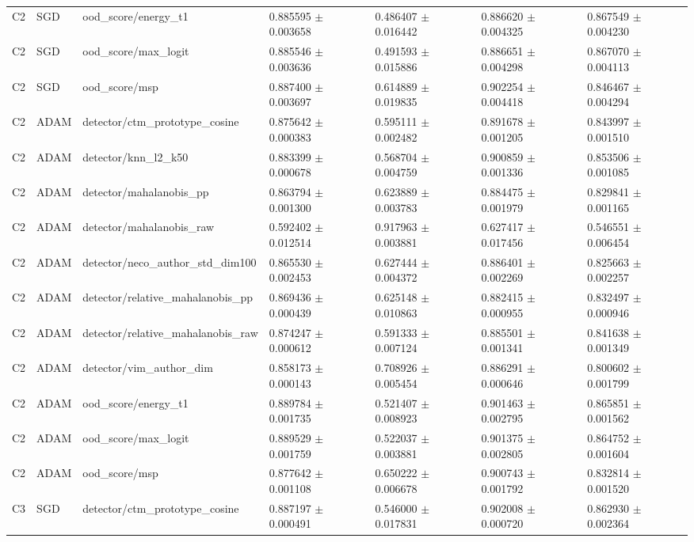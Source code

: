 \begin{longtable}{lllllll}
C2 & SGD & ood\_score/energy\_t1 & 0.885595 $\pm$ 0.003658 & 0.486407 $\pm$ 0.016442 & 0.886620 $\pm$ 0.004325 & 0.867549 $\pm$ 0.004230 \\
C2 & SGD & ood\_score/max\_logit & 0.885546 $\pm$ 0.003636 & 0.491593 $\pm$ 0.015886 & 0.886651 $\pm$ 0.004298 & 0.867070 $\pm$ 0.004113 \\
C2 & SGD & ood\_score/msp & 0.887400 $\pm$ 0.003697 & 0.614889 $\pm$ 0.019835 & 0.902254 $\pm$ 0.004418 & 0.846467 $\pm$ 0.004294 \\
C2 & ADAM & detector/ctm\_prototype\_cosine & 0.875642 $\pm$ 0.000383 & 0.595111 $\pm$ 0.002482 & 0.891678 $\pm$ 0.001205 & 0.843997 $\pm$ 0.001510 \\
C2 & ADAM & detector/knn\_l2\_k50 & 0.883399 $\pm$ 0.000678 & 0.568704 $\pm$ 0.004759 & 0.900859 $\pm$ 0.001336 & 0.853506 $\pm$ 0.001085 \\
C2 & ADAM & detector/mahalanobis\_pp & 0.863794 $\pm$ 0.001300 & 0.623889 $\pm$ 0.003783 & 0.884475 $\pm$ 0.001979 & 0.829841 $\pm$ 0.001165 \\
C2 & ADAM & detector/mahalanobis\_raw & 0.592402 $\pm$ 0.012514 & 0.917963 $\pm$ 0.003881 & 0.627417 $\pm$ 0.017456 & 0.546551 $\pm$ 0.006454 \\
C2 & ADAM & detector/neco\_author\_std\_dim100 & 0.865530 $\pm$ 0.002453 & 0.627444 $\pm$ 0.004372 & 0.886401 $\pm$ 0.002269 & 0.825663 $\pm$ 0.002257 \\
C2 & ADAM & detector/relative\_mahalanobis\_pp & 0.869436 $\pm$ 0.000439 & 0.625148 $\pm$ 0.010863 & 0.882415 $\pm$ 0.000955 & 0.832497 $\pm$ 0.000946 \\
C2 & ADAM & detector/relative\_mahalanobis\_raw & 0.874247 $\pm$ 0.000612 & 0.591333 $\pm$ 0.007124 & 0.885501 $\pm$ 0.001341 & 0.841638 $\pm$ 0.001349 \\
C2 & ADAM & detector/vim\_author\_dim & 0.858173 $\pm$ 0.000143 & 0.708926 $\pm$ 0.005454 & 0.886291 $\pm$ 0.000646 & 0.800602 $\pm$ 0.001799 \\
C2 & ADAM & ood\_score/energy\_t1 & 0.889784 $\pm$ 0.001735 & 0.521407 $\pm$ 0.008923 & 0.901463 $\pm$ 0.002795 & 0.865851 $\pm$ 0.001562 \\
C2 & ADAM & ood\_score/max\_logit & 0.889529 $\pm$ 0.001759 & 0.522037 $\pm$ 0.003881 & 0.901375 $\pm$ 0.002805 & 0.864752 $\pm$ 0.001604 \\
C2 & ADAM & ood\_score/msp & 0.877642 $\pm$ 0.001108 & 0.650222 $\pm$ 0.006678 & 0.900743 $\pm$ 0.001792 & 0.832814 $\pm$ 0.001520 \\
C3 & SGD & detector/ctm\_prototype\_cosine & 0.887197 $\pm$ 0.000491 & 0.546000 $\pm$ 0.017831 & 0.902008 $\pm$ 0.000720 & 0.862930 $\pm$ 0.002364 \\

\end{longtable}
